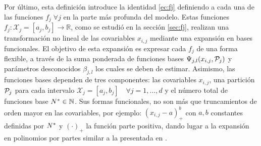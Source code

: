 \documentclass[../Main/Main.tex]{subfiles}
\begin{document}
Por último, esta definición introduce la identidad \eqref{ec:fj} definiendo a cada una de las funciones $f_j \; \forall j$ en la parte más profunda del modelo. Estas funciones $f_j: \mathcal{X}_j = [a_j,b_j] \rightarrow \mathbb{R}$, como se estudió en la sección \ref{sec:fj}, realizan una transformación no lineal de las covariables $x_{i,j}$ mediante una expansión en bases funcionales. El objetivo de esta expansión es expresar cada $f_j$ de una forma flexible, a través de la suma ponderada de funciones bases $\Psi_{j,l}(x_{i,j},\P_j)$ y parámetros desconocidos $\beta_{j,l}$ los cuales se deben de estimar. Asimismo, las funciones bases dependen de tres componentes: las covariables $x_{i,j}$, una partición $\P_j$ para cada intervalo $\mathcal{X}_j = [a_j, b_j] \quad \forall j = 1,\ldots,d$ y el número total de funciones base $\N\in\mathbb{N}$. Sus formas funcionales, no son más que truncamientos de orden mayor en las covariables, por ejemplo: $(x_{i,j} - a)_+^b$ con $a,b$ constantes definidas por $\N$ y $(\cdot)_+$ la función parte positiva, dando lugar a la expansión en  
polinomios por partes similar a la presentada en \citet{mallik1998automatic}.
\end{document}
